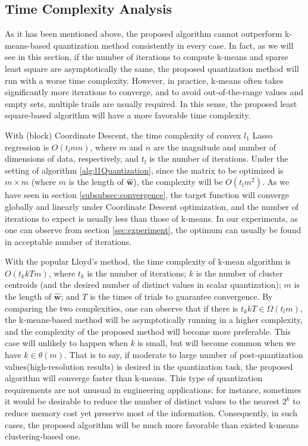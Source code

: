 \documentclass[preprint,10pt]{elsarticle}
\begin{document}
\subsection{Time Complexity Analysis}
As it has been mentioned above, the proposed algorithm cannot outperform k-means-based quantization method consistently in every case. In fact, as we will see in this section, if the number of iterations to compute k-means and sparse least square are asymptotically the same, the proposed quantization method will run with a worse time complexity. However, in practice, k-means often takes significantly more iterations to converge, and to avoid out-of-the-range values and empty sets, multiple trails are usually required. In this sense, the proposed least square-based algorithm will have a more favorable time complexity. \par 
With (block) Coordinate Descent, the time complexity of convex $l_{1}$ Lasso regression is $O(t_{l}mn)$, where $m$ and $n$ are the magnitude and number of dimensions of data, respectively, and $t_{l}$ is the number of iterations. Under the setting of algorithm \ref{alg:l1Quantization}, since the matrix to be optimized is $m \times m$ (where $m$ is the length of $\boldsymbol{\hat{w}}$), the complexity will be $O(t_{l}m^{2})$. As we have seen in section \ref{subsubsec:convergence}, the target function will converge globally and linearly under Coordinate Descent optimization, and the number of iterations to expect is usually less than those of k-means. In our experiments, as one can observe from section \ref{sec:experiment}, the optimum can usually be found in acceptable number of iterations.\par
With the popular Lloyd's method, the time complexity of k-mean algorithm is $O(t_{k}kTm)$, where $t_{k}$ is the number of iterations; $k$ is the number of cluster centroids (and the desired number of distinct values in scalar quantization); $m$ is the length of $\boldsymbol{\hat{w}}$; and $T$ is the times of trials to guarantee convergence. By comparing the two complexities, one can observe that if there is $t_{k}kT \in \Omega(t_{l}m)$, the k-means-based method will be asymptotically running in a higher complexity, and the complexity of the proposed method will become more preferable. This case will unlikely to happen when $k$ is small, but will become common when we have $k\in \theta(m)$. That is to say, if moderate to large number of post-quantization values(high-resolution results) is desired in the quantization task, the proposed algorithm will converge faster than k-means. This type of quantization requirements are not unusual in engineering applications: for instance, sometimes it would be desirable to reduce the number of distinct values to the nearest $2^k$ to reduce memory cost yet preserve most of the information. Consequently, in such cases, the proposed algorithm will be much more favorable than existed k-means clustering-based one.
\end{document}
